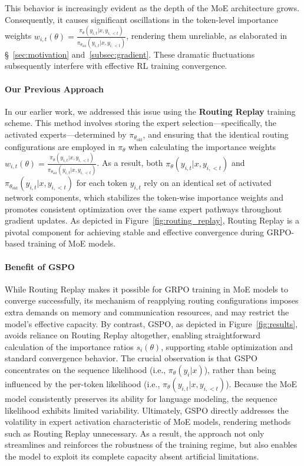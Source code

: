 This behavior is increasingly evident as the depth of the MoE architecture grows. Consequently, it causes significant oscillations in the token-level importance weights $w_{i,t}(\theta) = \frac{ \pi_{\theta} (y_{i,t} | x, y_{i,<t}) }{ \pi_{\theta_\text{old}} (y_{i,t} | x,y_{i,<t})}$, rendering them unreliable, as elaborated in \S~\ref{sec:motivation} and~\ref{subsec:gradient}. These dramatic fluctuations subsequently interfere with effective RL training convergence.

\paragraph{Our Previous Approach} In our earlier work, we addressed this issue using the \textbf{Routing Replay} training scheme. This method involves storing the expert selection—specifically, the activated experts—determined by $\pi_{\theta_\text{old}}$, and ensuring that the identical routing configurations are employed in $\pi_{\theta}$ when calculating the importance weights $w_{i,t}(\theta) = \frac{ \pi_{\theta} (y_{i,t} | x, y_{i,<t}) }{ \pi_{\theta_\text{old}} (y_{i,t} | x,y_{i,<t})}$. As a result, both $\pi_{\theta} (y_{i,t} | x, y_{i,<t})$ and $\pi_{\theta_\text{old}} (y_{i,t} | x,y_{i,<t})$ for each token $y_{i,t}$ rely on an identical set of activated network components, which stabilizes the token-wise importance weights and promotes consistent optimization over the same expert pathways throughout gradient updates. As depicted in Figure~\ref{fig:routing_replay}, Routing Replay is a pivotal component for achieving stable and effective convergence during GRPO-based training of MoE models.

\paragraph{Benefit of GSPO} While Routing Replay makes it possible for GRPO training in MoE models to converge successfully, its mechanism of reapplying routing configurations imposes extra demands on memory and communication resources, and may restrict the model’s effective capacity. By contrast, GSPO, as depicted in Figure~\ref{fig:results}, avoids reliance on Routing Replay altogether, enabling straightforward calculation of the importance ratios $s_i(\theta)$, supporting stable optimization and standard convergence behavior. The crucial observation is that GSPO concentrates on the sequence likelihood (i.e., $\pi_{\theta} (y_i | x)$), rather than being influenced by the per-token likelihood (i.e., $\pi_{\theta} (y_{i,t} | x, y_{i,<t})$). Because the MoE model consistently preserves its ability for language modeling, the sequence likelihood exhibits limited variability. Ultimately, GSPO directly addresses the volatility in expert activation characteristic of MoE models, rendering methods such as Routing Replay unnecessary. As a result, the approach not only streamlines and reinforces the robustness of the training regime, but also enables the model to exploit its complete capacity absent artificial limitations.

